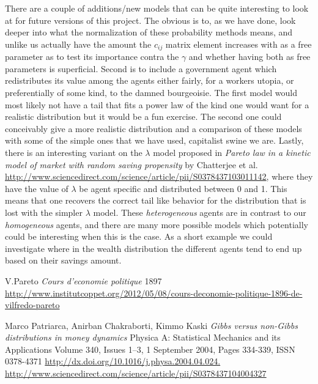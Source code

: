 \documentclass[a4paper,11pt]{article}
\begin{document}
{There are a couple of additions/new models that can be quite interesting to look at for future versions of this project. The obvious is to, as we have done, look deeper into what the normalization of these probability methods means, and unlike us actually have the amount the $c_{ij}$ matrix element increases with as a free parameter as to test its importance contra the $\gamma$ and whether having both as free parameters is superficial. Second is to include a government agent which redistributes its value among the agents either fairly, for a workers utopia, or preferentially of some kind, to the damned bourgeoisie. The first model would most likely not have a tail that fits a power law of the kind one would want for a realistic distribution but it would be a fun exercise. The second one could conceivably give a more realistic distribution and a comparison of these models with some of the simple ones that we have used, capitalist swine we are. Lastly, there is an interesting variant on the $\lambda$ model proposed in \textit{Pareto law in a kinetic model of market with random saving propensity} by Chatterjee et al. \url{http://www.sciencedirect.com/science/article/pii/S0378437103011142}, where they have the value of $\lambda$ be agent specific and distributed between 0 and 1. This means that one recovers the correct tail like behavior for the distribution that is lost with the simpler $\lambda$ model. These \emph{heterogeneous} agents are in contrast to our \emph{homogeneous} agents, and there are many more possible models which potentially could be interesting when this is the case. As a short example we could investigate where in the wealth distribution the different agents tend to end up based on their savings amount.  







\begin{thebibliography}{3}
			
	V.Pareto
	\emph{Cours d'economie politique}
	1897
	\url{http://www.institutcoppet.org/2012/05/08/cours-deconomie-politique-1896-de-vilfredo-pareto}
	
	Marco Patriarca, Anirban Chakraborti, Kimmo Kaski
	\emph{ Gibbs versus non-Gibbs distributions in money dynamics}
	Physica A: Statistical Mechanics and its Applications
	Volume 340, Issues 1–3, 1 September 2004, Pages 334-339, ISSN 0378-4371
	\url{http://dx.doi.org/10.1016/j.physa.2004.04.024.}
	\url{http://www.sciencedirect.com/science/article/pii/S0378437104004327}
	

\end{thebibliography}}
\end{document}
